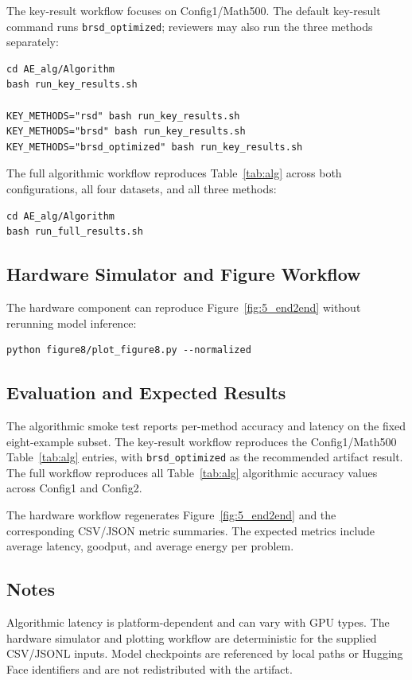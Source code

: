 The key-result workflow focuses on Config1/Math500. The default key-result
command runs \texttt{brsd\_optimized}; reviewers may also run the three methods
separately:
\begin{verbatim}
cd AE_alg/Algorithm
bash run_key_results.sh

KEY_METHODS="rsd" bash run_key_results.sh
KEY_METHODS="brsd" bash run_key_results.sh
KEY_METHODS="brsd_optimized" bash run_key_results.sh
\end{verbatim}

The full algorithmic workflow reproduces Table~\ref{tab:alg} across both configurations,
all four datasets, and all three methods:
\begin{verbatim}
cd AE_alg/Algorithm
bash run_full_results.sh
\end{verbatim}

\subsection{Hardware Simulator and Figure Workflow}
The hardware component can reproduce Figure~\ref{fig:5_end2end} without
rerunning model inference:
\begin{verbatim}
python figure8/plot_figure8.py --normalized
\end{verbatim}


\subsection{Evaluation and Expected Results}
The algorithmic smoke test reports per-method accuracy and latency on the fixed
eight-example subset. The key-result workflow reproduces the Config1/Math500
Table~\ref{tab:alg} entries, with \texttt{brsd\_optimized} as the recommended artifact
result. The full workflow reproduces all Table~\ref{tab:alg} algorithmic accuracy values
across Config1 and Config2.

The hardware workflow regenerates Figure~\ref{fig:5_end2end} and the corresponding
CSV/JSON metric summaries. The
expected metrics include average latency, goodput, and average energy per
problem.

\subsection{Notes}
Algorithmic latency is platform-dependent and can vary with GPU
types. The hardware simulator
and plotting workflow are deterministic for the supplied CSV/JSONL inputs. Model
checkpoints are referenced by local paths or Hugging Face identifiers and are
not redistributed with the artifact.

